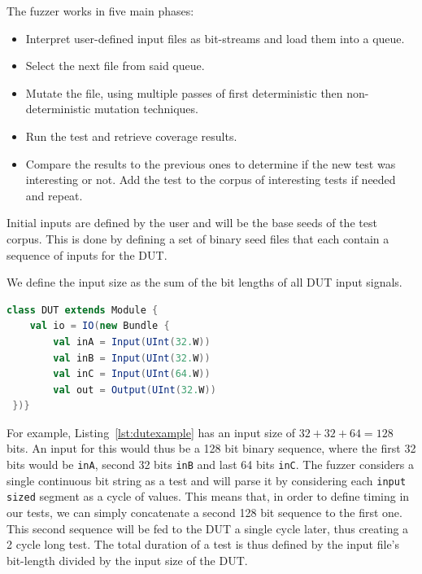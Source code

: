 \documentclass[conference]{IEEEtran}
\begin{document}
The fuzzer works in five main phases:  
\begin{itemize}
\item Interpret user-defined input files as bit-streams and load them into a queue.
\item Select the next file from said queue.
\item Mutate the file, using multiple passes of first deterministic then non-deterministic mutation techniques.  
\item Run the test and retrieve coverage results. 
\item Compare the results to the previous ones to determine if the new test was interesting or not. Add the test to the corpus of interesting tests if needed and repeat. 
\end{itemize}  

Initial inputs are defined by the user and will be the base seeds of the test corpus.
This is done by defining a set of binary seed files that each contain a sequence of inputs for the DUT.

We define the input size as the sum of the bit lengths of all DUT input signals.
\begin{lstlisting}[captionpos=b,caption={DUT with two 32 bit inputs, one 64 input, and a 32 bit output.},label={lst:dutexample},language=scala]
class DUT extends Module {
    val io = IO(new Bundle {
        val inA = Input(UInt(32.W))
        val inB = Input(UInt(32.W))
        val inC = Input(UInt(64.W))
        val out = Output(UInt(32.W))
 })}
\end{lstlisting}
For example, Listing~\ref{lst:dutexample} has an input size of $32 + 32 + 64 = 128$ bits.
An input for this would thus be a 128 bit binary sequence, where the first 32 bits would be \texttt{inA}, second 32 bits \texttt{inB} and last 64 bits \texttt{inC}.
The fuzzer considers a single continuous bit string as a test and will parse it by considering each \texttt{input sized} segment as a cycle of values.
This means that, in order to define timing in our tests, we can simply concatenate a second 128 bit sequence to the first one.
This second sequence will be fed to the DUT a single cycle later, thus creating a 2 cycle long test.
The total duration of a test is thus defined by the input file's bit-length divided by the input size of the DUT.
\end{document}
